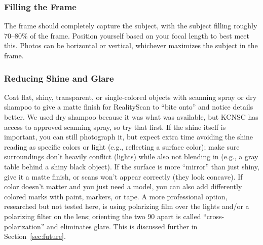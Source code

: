 \documentclass[11pt]{article}
\begin{document}
\subsubsection{Filling the Frame}
The frame should completely capture the subject, with the subject filling roughly 70--80\% of the frame. Position yourself based on your focal length to best meet this. Photos can be horizontal or vertical, whichever maximizes the subject in the frame.

\subsubsection{Reducing Shine and Glare}
\label{sec:common-shine}
Coat flat, shiny, transparent, or single-colored objects with scanning spray or dry shampoo to give a matte finish for RealityScan to ``bite onto'' and notice details better. We used dry shampoo because it was what was available, but KCNSC has access to approved scanning spray, so try that first. If the shine itself is important, you can still photograph it, but expect extra time avoiding the shine reading as specific colors or light (e.g., reflecting a surface color); make sure surroundings don't heavily conflict (lights) while also not blending in (e.g., a gray table behind a shiny black object). If the surface is more ``mirror'' than just shiny, give it a matte finish, or scans won't appear correctly (they look concave). If color doesn't matter and you just need a model, you can also add differently colored marks with paint, markers, or tape. A more professional option, researched but not tested here, is using polarizing film over the lights and/or a polarizing filter on the lens; orienting the two 90\textdegree{} apart is called ``cross-polarization'' and eliminates glare. This is discussed further in Section~\ref{sec:future}.
\end{document}
